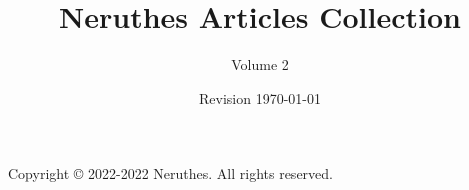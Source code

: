 \documentclass[12pt,a4paper]{report}
\title{Neruthes Articles Collection}
\author{Volume 2}
\date{Revision \today}
\begin{document}
\begin{titlepage}
    \sffamily
    \maketitle
\end{titlepage}
\tableofcontents\clearpage




\clearpage\pagestyle{empty}
\leavevmode\vfill
\small\sffamily
Copyright \copyright{} 2022-2022 Neruthes. All rights reserved.
\end{document}
